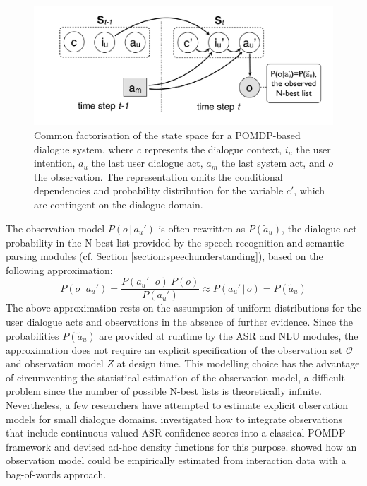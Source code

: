 \begin{figure}[h]
\centering
\includegraphics[scale=0.28]{imgs/POMDP2.pdf}
\caption{Common factorisation of the state space for a POMDP-based dialogue system, where $c$ represents the dialogue context, $i_u$ the user intention, $a_u$ the last user dialogue act, $a_m$ the last system act, and $o$ the observation. The representation omits the conditional dependencies and probability distribution for the variable $c'$, which are contingent on the dialogue domain.}
\label{fig:pomdp2}
\end{figure}

The observation model $P(o \, | \, a_u')$ is often rewritten as $P(\tilde{a}_u)$, the dialogue act probability in the N-best list provided by the speech recognition and semantic parsing modules (cf. Section \ref{section:speechunderstanding}), based on the following approximation:
\begin{equation}
P(o \, | \, a_u') = \frac{P(a_u' \, | \, o) \ P(o)} {P(a_u')} \approx P(a_u' \, | \, o) = P(\tilde{a}_u)
\end{equation}
The above approximation rests on the assumption of uniform distributions for the user dialogue acts and observations in the absence of further evidence. Since the probabilities $P(\tilde{a}_u)$ are provided at runtime by the ASR and NLU modules, the approximation does not require an explicit specification of the observation set $\mathcal{O}$ and observation model $Z$ at design time.  This modelling choice has the advantage of circumventing the statistical estimation of the observation model, a difficult problem since the number of possible N-best lists is theoretically infinite. Nevertheless, a few researchers have attempted to estimate explicit observation models for small dialogue domains. \cite{Williamsetal:2008} investigated how to integrate observations that include continuous-valued ASR confidence scores into a classical POMDP framework and devised ad-hoc density functions for this purpose.  \cite{chinaei2012} showed how an observation model could be empirically estimated from interaction data with a bag-of-words approach. 

